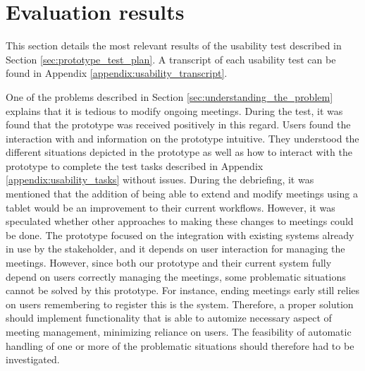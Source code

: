 \section{Evaluation results}\label{sec:usability_evaluation_results}
This section details the most relevant results of the usability test described in Section \ref{sec:prototype_test_plan}.
A transcript of each usability test can be found in Appendix \ref{appendix:usability_transcript}.

One of the problems described in Section \ref{sec:understanding_the_problem} explains that it is tedious to modify ongoing meetings. 
During the test, it was found that the prototype was received positively in this regard. 
Users found the interaction with and information on the prototype intuitive. 
They understood the different situations depicted in the prototype as well as how to interact with the prototype to complete the test tasks described in Appendix \ref{appendix:usability_tasks} without issues.
During the debriefing, it was mentioned that the addition of being able to extend and modify meetings using a tablet would be an improvement to their current workflows.
However, it was speculated whether other approaches to making these changes to meetings could be done. 
The prototype focused on the integration with existing systems already in use by the stakeholder, and it depends on user interaction for managing the meetings.
However, since both our prototype and their current system fully depend on users correctly managing the meetings, some problematic situations cannot be solved by this prototype. 
For instance, ending meetings early still relies on users remembering to register this is the system. 
Therefore, a proper solution should implement functionality that is able to automize necessary aspect of meeting management, minimizing reliance on users.
The feasibility of  automatic handling of one or more of the problematic situations should therefore had to be investigated.